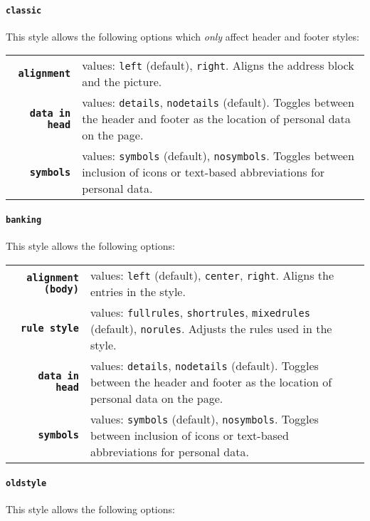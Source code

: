 \documentclass[a4paper, 11pt]{article}
\newcommand{\code}[1]{\lstinline!#1!}
\begin{document}
\paragraph{\code{classic}}
This style allows the following options which \emph{only} affect header and footer styles:

\begin{tabular}{r@{\hspace{2ex}}p{}}
  \textbf{\code{alignment}}    & values: \code{left} (default), \code{right}.
  Aligns the address block and the picture. \\
  \textbf{\code{data in head}} & values: \code{details}, \code{nodetails} (default).
  Toggles between the header and footer as the location of personal data on the page. \\
  \textbf{\code{symbols}}      & values: \code{symbols} (default), \code{nosymbols}.
  Toggles between inclusion of icons or text-based abbreviations for personal data.
\end{tabular}

\paragraph{\code{banking}}
This style allows the following options:

\begin{tabular}{r@{\hspace{2ex}}p{}}
  \textbf{\code{alignment (body)}} & values: \code{left} (default), \code{center}, \code{right}.
  Aligns the entries in the style. \\
  \textbf{\code{rule style}}       & values: \code{fullrules}, \code{shortrules}, \code{mixedrules} (default), \code{norules}.
  Adjusts the rules used in the style. \\
  \textbf{\code{data in head}}     & values: \code{details}, \code{nodetails} (default).
  Toggles between the header and footer as the location of personal data on the page. \\
  \textbf{\code{symbols}}          & values: \code{symbols} (default), \code{nosymbols}.
  Toggles between inclusion of icons or text-based abbreviations for personal data.
\end{tabular}

\paragraph{\code{oldstyle}}
This style allows the following options:
\end{document}
